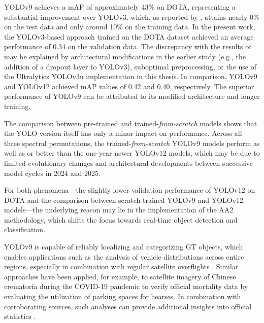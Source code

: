 \acrshort{YOLO}v9 achieves a \acrshort{mAP} of approximately 43\% on \acrshort{DOTA}, representing a substantial improvement over \acrshort{YOLO}v3, which, as reported by \citeauthor{Balzer2022} \cite{Balzer2022}, attains nearly 0\% on the test data and only around 10\% on the training data. In the present work, the \acrshort{YOLO}v3-based approach trained on the \acrshort{DOTA} dataset achieved an average performance of 0.34 on the validation data. The discrepancy with the results of \citeauthor{Balzer2022} may be explained by architectural modifications in the earlier study (e.g., the addition of a dropout layer to YOLOv3), suboptimal preprocessing, or the use of the Ultralytics \acrshort{YOLO}v3u implementation in this thesis. In comparison, \acrshort{YOLO}v9 and \acrshort{YOLO}v12 achieved \acrshort{mAP} values of 0.42 and 0.40, respectively. The superior performance of \acrshort{YOLO}v9 can be attributed to its modified architecture and longer training. 

The comparison between pre-trained and trained-\textit{from-scratch} models shows that the \acrshort{YOLO} version itself has only a minor impact on performance. Across all three spectral permutations, the trained-\textit{from-scratch} \acrshort{YOLO}v9 models perform as well as or better than the one-year newer \acrshort{YOLO}v12 models, which may be due to limited evolutionary changes and architectural developments between successive model cycles in 2024 and 2025.

For both phenomena—the slightly lower validation performance of \acrshort{YOLO}v12 on \acrshort{DOTA} and the comparison between scratch-trained \acrshort{YOLO}v9 and \acrshort{YOLO}v12 models—the underlying reason may lie in the implementation of the \acrshort{AA2} methodology, which shifts the focus towards real-time object detection and classification.



\acrshort{YOLO}v9 is capable of reliably localizing and categorizing \Acrlong{GT} objects, which enables applications such as the analysis of vehicle distributions across entire regions, especially in combination with regular satellite overflights \cite{planet_labs, airbus_neo}. Similar approaches have been applied, for example, to satellite imagery of Chinese crematoria during the COVID-19 pandemic to verify official mortality data by evaluating the utilization of parking spaces for hearses. In combination with corroborating sources, such analyses can provide additional insights into official statistics \cite{Spiegel_article}. 


